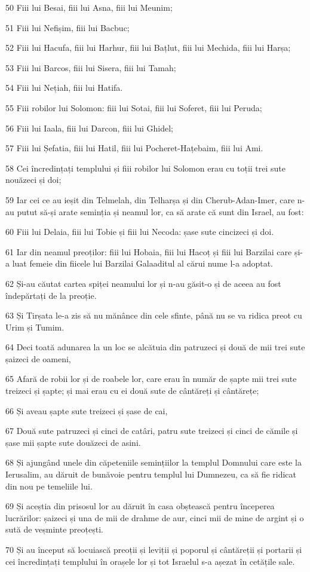 \par 50 Fiii lui Besai, fiii lui Asna, fiii lui Meunim;
\par 51 Fiii lui Nefișim, fiii lui Bacbuc;
\par 52 Fiii lui Hacufa, fiii lui Harhur, fiii lui Bațlut, fiii lui Mechida, fiii lui Harșa;
\par 53 Fiii lui Barcos, fiii lui Sisera, fiii lui Tamah;
\par 54 Fiii lui Nețiah, fiii lui Hatifa.
\par 55 Fiii robilor lui Solomon: fiii lui Sotai, fiii lui Soferet, fiii lui Peruda;
\par 56 Fiii lui Iaala, fiii lui Darcon, fiii lui Ghidel;
\par 57 Fiii lui Șefatia, fiii lui Hatil, fiii lui Pocheret-Hațebaim, fiii lui Ami.
\par 58 Cei încredințați templului și fiii robilor lui Solomon erau cu toții trei sute nouăzeci și doi;
\par 59 Iar cei ce au ieșit din Telmelah, din Telharșa și din Cherub-Adan-Imer, care n-au putut să-și arate seminția și neamul lor, ca să arate că sunt din Israel, au fost:
\par 60 Fiii lui Delaia, fiii lui Tobie și fiii lui Necoda: șase sute cincizeci și doi.
\par 61 Iar din neamul preoților: fiii lui Hobaia, fiii lui Hacoț și fiii lui Barzilai care și-a luat femeie din fiicele lui Barzilai Galaaditul al cărui nume l-a adoptat.
\par 62 Și-au căutat cartea spiței neamului lor și n-au găsit-o și de aceea au fost îndepărtați de la preoție.
\par 63 Și Tirșata le-a zis să nu mănânce din cele sfinte, până nu se va ridica preot cu Urim și Tumim.
\par 64 Deci toată adunarea la un loc se alcătuia din patruzeci și două de mii trei sute șaizeci de oameni,
\par 65 Afară de robii lor și de roabele lor, care erau în număr de șapte mii trei sute treizeci și șapte; și mai erau cu ei două sute de cântăreți și cântărețe;
\par 66 Și aveau șapte sute treizeci și șase de cai,
\par 67 Două sute patruzeci și cinci de catâri, patru sute treizeci și cinci de cămile și șase mii șapte sute douăzeci de asini.
\par 68 Și ajungând unele din căpeteniile semințiilor la templul Domnului care este la Ierusalim, au dăruit de bunăvoie pentru templul lui Dumnezeu, ca să fie ridicat din nou pe temeliile lui.
\par 69 Și aceștia din prisosul lor au dăruit în casa obștească pentru începerea lucrărilor: șaizeci și una de mii de drahme de aur, cinci mii de mine de argint și o sută de veșminte preoțești.
\par 70 Și au început să locuiască preoții și leviții și poporul și cântăreții și portarii și cei încredințați templului în orașele lor și tot Israelul s-a așezat în cetățile sale.

